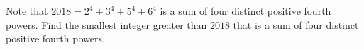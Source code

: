 Note that $2018=2^4+3^4+5^4+6^4$ is a sum of four distinct positive fourth powers. Find the smallest integer greater than $2018$ that is a sum of four distinct positive fourth powers.
